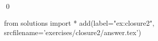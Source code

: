 
\begin{ex} 
  \label{ex:closure2}
  
  \qed
\end{ex} 
\begin{python0}
from solutions import *
add(label="ex:closure2",
    srcfilename='exercises/closure2/answer.tex') 
\end{python0}

